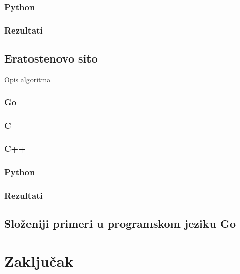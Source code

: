 \documentclass[12pt,oneside]{memoir}
\begin{document}
\subsection{Python}

\subsection{Rezultati}



\section{Eratostenovo sito}
Opis algoritma

\subsection{Go}

\subsection{C}

\subsection{C++}

\subsection{Python}

\subsection{Rezultati}



\section{Složeniji primeri u programskom jeziku Go}




\chapter{Zaključak}





\printbibliography 
\backmatter
\end{document}
